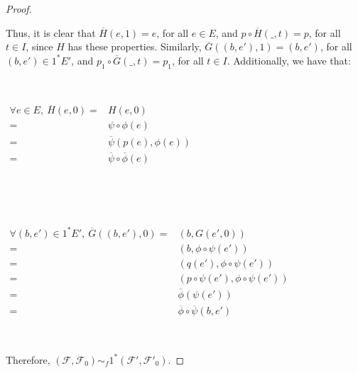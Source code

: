 \documentclass[12pt,oneside]{book}
\begin{document}
\begin{proof}
        \
        
        Thus, it is clear that $\overline{H}(e,1)=e$, for all $e\in E$, and $p\circ\overline{H}(\_,t)=p$, for all $t\in I$, since $H$ has 
        these properties. Similarly, $\overline{G}((b,e'),1)=(b,e')$, for all $(b,e')\in 1^{*}E'$, and $p_{1}\circ\overline{G}(\_,t)=p_{1}$, 
        for all $t\in I$. Additionally, we have that:

        \
        
        $\begin{array}{rl}
            \forall e\in E, \ \overline{H}(e,0) = & H(e,0) \\
            = & \psi\circ\phi(e) \\
            = & \overline{\psi}(p(e),\phi(e)) \\
            = & \overline{\psi}\circ\overline{\phi}(e)
        \end{array}$

        \
 
        \

        $\begin{array}{rl}
            \forall (b,e')\in 1^{*}E', \ \overline{G}((b,e'),0) = & (b,G(e',0)) \\
            = & (b,\phi\circ\psi(e')) \\
            = & (q(e'),\phi\circ\psi(e')) \\
            = & (p\circ\psi(e'),\phi\circ\psi(e')) \\
            = & \overline{\phi}(\psi(e')) \\
            = & \overline{\phi}\circ\overline{\psi}(b,e')
        \end{array}$

        \
        
        Therefore, $(\mathcal{F},\mathcal{F}_{0})\sim_{f} 1^{*}(\mathcal{F'},\mathcal{F'}_{0})$.
    
    \end{proof}
\end{document}
